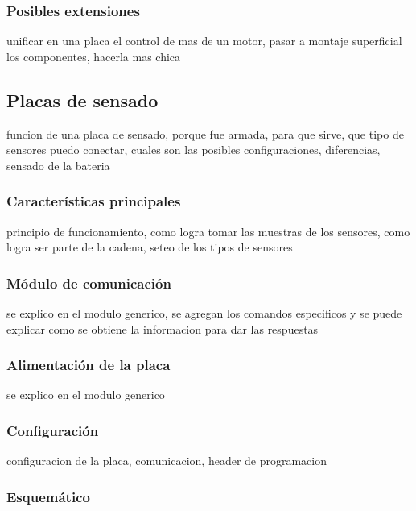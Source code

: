 \subsubsection{Posibles extensiones}
\label{h_placas_motorDC_extensiones}

unificar en una placa el control de mas de un motor, pasar a montaje superficial los componentes, hacerla mas chica

\subsection{Placas de sensado}
\label{h_placas_sensado}

funcion de una placa de sensado, porque fue armada, para que sirve, que tipo de sensores puedo conectar, cuales son las posibles configuraciones, diferencias, sensado de la bateria

\subsubsection{Caracter\'isticas principales}
\label{h_placas_sensado_caracteristicas}

principio de funcionamiento, como logra tomar las muestras de los sensores, como logra ser parte de la cadena, seteo de los tipos de sensores

\subsubsection{M\'odulo de comunicaci\'on}
\label{h_placas_sensado_comm}

se explico en el modulo generico, se agregan los comandos especificos y se puede explicar como se obtiene la informacion para dar las respuestas

\subsubsection{Alimentaci\'on de la placa}
\label{h_placas_sensado_alimentacion}

se explico en el modulo generico

\subsubsection{Configuraci\'on}
\label{h_placas_sensado_config}

configuracion de la placa, comunicacion, header de programacion

\subsubsection{Esquem\'atico}
\label{h_placas_sensado_esquematico}

